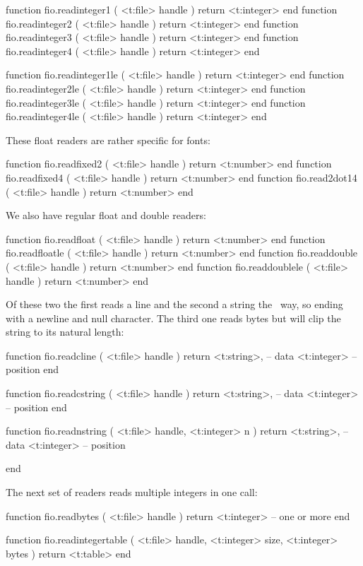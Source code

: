 function fio.readinteger1 ( <t:file> handle ) return <t:integer> end
function fio.readinteger2 ( <t:file> handle ) return <t:integer> end
function fio.readinteger3 ( <t:file> handle ) return <t:integer> end
function fio.readinteger4 ( <t:file> handle ) return <t:integer> end

function fio.readinteger1le ( <t:file> handle ) return <t:integer> end
function fio.readinteger2le ( <t:file> handle ) return <t:integer> end
function fio.readinteger3le ( <t:file> handle ) return <t:integer> end
function fio.readinteger4le ( <t:file> handle ) return <t:integer> end
\stoptyping

These float readers are rather specific for fonts:

\starttyping[option=LUA]
function fio.readfixed2 ( <t:file> handle ) return <t:number>  end
function fio.readfixed4 ( <t:file> handle ) return <t:number>  end
function fio.read2dot14 ( <t:file> handle ) return <t:number>  end
\stoptyping

We also have regular float and double readers:

\starttyping[option=LUA]
function fio.readfloat    ( <t:file> handle ) return <t:number>  end
function fio.readfloatle  ( <t:file> handle ) return <t:number>  end
function fio.readdouble   ( <t:file> handle ) return <t:number>  end
function fio.readdoublele ( <t:file> handle ) return <t:number>  end
\stoptyping

Of these two the first reads a line and the second a string the \CCODE\ way, so
ending with a newline and null character. The third one reads  bytes but
will clip the string to its natural length:

\starttyping[option=LUA]
function fio.readcline   (
    <t:file> handle
)
    return
        <t:string>,  -- data
        <t:integer>  -- position
end

function fio.readcstring (
    <t:file> handle
)
    return
        <t:string>,  -- data
        <t:integer>  -- position
end

function fio.readnstring (
    <t:file>    handle,
    <t:integer> n
)
    return
        <t:string>,  -- data
        <t:integer>  -- position

end
\stoptyping

The next set of readers reads multiple integers in one call:

\starttyping[option=LUA]
function fio.readbytes (
    <t:file> handle
)
    return <t:integer> -- one or more
end

function fio.readintegertable (
    <t:file>    handle,
    <t:integer> size,
    <t:integer> bytes
)
    return <t:table>
end

